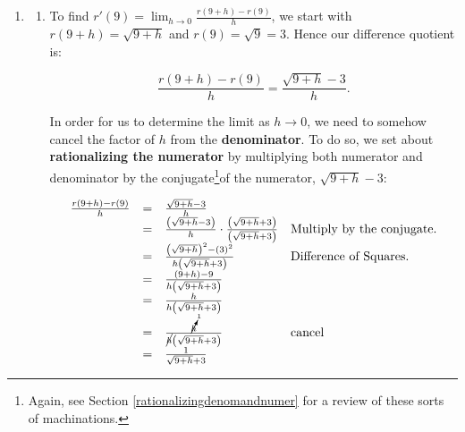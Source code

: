 \documentclass{ximera}
\begin{document}
\begin{example}
\begin{explanation}
\begin{enumerate}
\begin{enumerate}
Hence, \[g'(x) = \lim_{h \rightarrow 0} \frac{-6}{(2x+2h+1)(2x+1)} = \frac{-6}{(2x + 2(0) +1)(2x+1)} = - \frac{6}{(2x+1)^2}. \]   We check $g'(0) = -\frac{6}{(2(0)+1)^2} = \ldots = -6$, as required.

\end{enumerate}



\item \begin{enumerate} \item To find $r'(9) = \lim_{h \rightarrow 0}\frac{r(9+h) - r(9)}{h}$, we start with $r(9+h) = \sqrt{9+h}$ and $r(9) = \sqrt{9} = 3$. Hence  our difference quotient is:

\[  \frac{r(9+h)-r(9)}{h} =  \frac{\sqrt{9+h} - 3}{h}.\]


In order for us to determine the limit as $h \rightarrow 0$, we need to somehow cancel the factor of $h$ from the  \textbf{denominator}.  To do so,  we set about \textbf{rationalizing the numerator} by multiplying both numerator and denominator by the conjugate\footnote{Again, see Section  \ref{rationalizingdenomandnumer} for a review of these sorts of machinations.}of the numerator, $\sqrt{9+h} - 3$:


\[ \begin{array}{rcll}  

 \frac{r(9+h) - r(9)}{h} & = &  \frac{\sqrt{9+h} - 3}{h} & \\ 
												
	 & = &  \frac{\left(\sqrt{9+h} - 3 \right)}{h} \cdot  \frac{\left(\sqrt{9+h} + 3\right)}{\left(\sqrt{9+h} + 3\right)} & \text{Multiply by the conjugate.} \\ 
										
    & = &   \frac{\left(\sqrt{9+h}\right)^2 -(3)^2}{h\left(\sqrt{9+h} + 3\right)} & \text{Difference of Squares.}\\ 
												
	& = &   \frac{(9+h) - 9}{h\left(\sqrt{9+h} + 3\right)} & \\ 
												
	& = &   \frac{h}{h\left(\sqrt{9+h} + 3\right)} & \\ 
												 
	& = &   \frac{\cancelto{1}{h}}{\cancel{h}\left(\sqrt{9+h} + 3\right)} & \text{cancel} \\ 
										
										
	 & = &   \frac{1}{\sqrt{9+h} +3} & \\ \end{array}\]	



\end{enumerate}
\end{enumerate}
\end{explanation}
\end{example}
\end{document}
